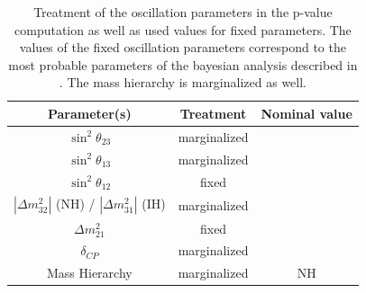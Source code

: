 \begin{table}
\centering
 \begin{tabular}{| c | c | c |}
 \hline
 Parameter(s)                                               			&     Treatment              &           Nominal value 		    \\
\hline
$\sin^{2}\theta_{23}$                                       			&     marginalized         &                \MixingTwoThreeNH        \\
$\sin^{2}\theta_{13}$  							&     marginalized         &                \MixingOneThreeNH	 \\
$\sin^{2}\theta_{12}$  							&     fixed               	    &             \MixingOneTwoIH              \\
$|\Delta m^{2}_{32}|$ (NH) / $|\Delta m^{2}_{31}|$ (IH)      &     marginalized          &               \DmsqNH		          \\
$\Delta m^{2}_{21}$      							&     fixed                       &             \dmsqIH                         	\\
$\delta_{CP}$                                               			&     marginalized           &              \DeltaCPNH		      \\
Mass Hierarchy									&     marginalized	    &            	NH         \\  
\hline
\end{tabular}
\caption{
Treatment of the oscillation parameters in the p-value computation as well as used values for fixed parameters.
The values of the fixed oscillation parameters correspond to the most probable parameters of the bayesian analysis
described in \cite{T2KLongPaper,Mach3JointFitRun14}.
The mass hierarchy is marginalized as well.
}
\label{tab:osc_params_fixed_values_reactor}
\end{table}
